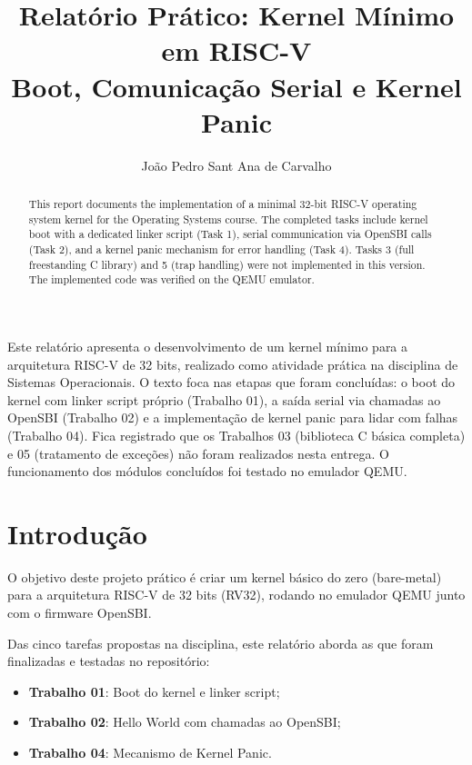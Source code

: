 \documentclass[12pt]{article}
\title{Relatório Prático: Kernel Mínimo em RISC-V\\
\large Boot, Comunicação Serial e Kernel Panic}
\author{João Pedro Sant Ana de Carvalho}
\begin{document}
\maketitle

\begin{abstract}
This report documents the implementation of a minimal 32-bit RISC-V operating system kernel for the Operating Systems course. The completed tasks include kernel boot with a dedicated linker script (Task 1), serial communication via OpenSBI calls (Task 2), and a kernel panic mechanism for error handling (Task 4). Tasks 3 (full freestanding C library) and 5 (trap handling) were not implemented in this version. The implemented code was verified on the QEMU emulator.
\end{abstract}

\begin{resumo}
Este relatório apresenta o desenvolvimento de um kernel mínimo para a arquitetura RISC-V de 32 bits, realizado como atividade prática na disciplina de Sistemas Operacionais. O texto foca nas etapas que foram concluídas: o boot do kernel com linker script próprio (Trabalho 01), a saída serial via chamadas ao OpenSBI (Trabalho 02) e a implementação de kernel panic para lidar com falhas (Trabalho 04). Fica registrado que os Trabalhos 03 (biblioteca C básica completa) e 05 (tratamento de exceções) não foram realizados nesta entrega. O funcionamento dos módulos concluídos foi testado no emulador QEMU.
\end{resumo}

\section{Introdução}

O objetivo deste projeto prático é criar um kernel básico do zero (bare-metal) para a arquitetura RISC-V de 32 bits (RV32), rodando no emulador QEMU junto com o firmware OpenSBI.

Das cinco tarefas propostas na disciplina, este relatório aborda as que foram finalizadas e testadas no repositório:
\begin{itemize}
    \item \textbf{Trabalho 01}: Boot do kernel e linker script;
    \item \textbf{Trabalho 02}: Hello World com chamadas ao OpenSBI;
    \item \textbf{Trabalho 04}: Mecanismo de Kernel Panic.
\end{itemize}
\end{document}
